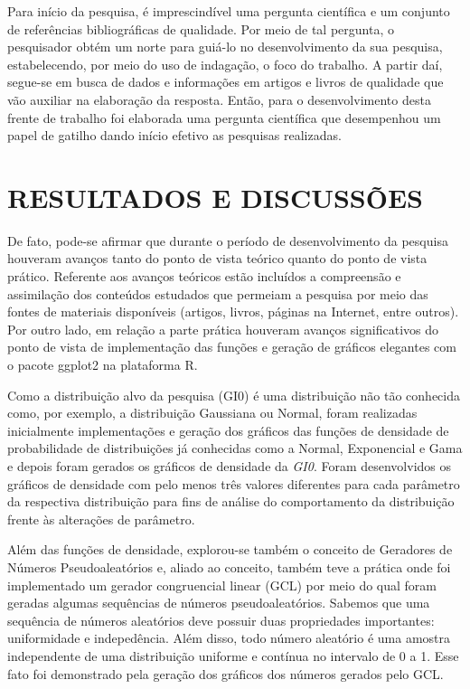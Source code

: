 \documentclass[12pt,letterpaper]{article}
\begin{document}
	Para início da pesquisa, é imprescindível uma pergunta científica e um conjunto de referências bibliográficas de qualidade. Por meio de tal pergunta, o pesquisador obtém um norte para guiá-lo no desenvolvimento da sua pesquisa, estabelecendo, por meio do uso de indagação, o foco do trabalho. A partir daí, segue-se em busca de dados e informações em artigos e livros de qualidade que vão auxiliar na elaboração da resposta. Então, para o desenvolvimento desta frente de trabalho foi elaborada uma pergunta científica que desempenhou um papel de gatilho dando início efetivo as pesquisas realizadas.



\newpage
\section*{\centering \textbf{RESULTADOS E DISCUSSÕES}} %

De fato, pode-se afirmar que durante o período de desenvolvimento da pesquisa houveram avanços tanto do ponto de vista teórico quanto do ponto de vista prático. Referente aos avanços teóricos estão incluídos a compreensão e assimilação dos conteúdos estudados que permeiam a pesquisa por meio das fontes de materiais disponíveis (artigos, livros, páginas na Internet, entre outros). Por outro lado, em relação a parte prática houveram avanços significativos do ponto de vista de implementação das funções e geração de gráficos elegantes com o pacote ggplot2 na plataforma R.

Como a distribuição alvo da pesquisa (GI0) é uma distribuição não tão conhecida como, por exemplo, a distribuição Gaussiana ou Normal, foram realizadas inicialmente implementações e geração dos gráficos das funções de densidade de probabilidade de distribuições já conhecidas como a Normal, Exponencial e Gama e depois foram gerados os gráficos de densidade da \textit{GI0}. Foram desenvolvidos os gráficos de densidade com pelo menos três valores diferentes para cada parâmetro da respectiva distribuição para fins de análise do comportamento da distribuição frente às alterações de parâmetro.

	Além das funções de densidade, explorou-se também o conceito de Geradores de Números Pseudoaleatórios e, aliado ao conceito, também teve a prática onde foi implementado um gerador congruencial linear (GCL) por meio do qual foram geradas algumas sequências de números pseudoaleatórios. Sabemos que uma sequência de números aleatórios deve possuir duas propriedades importantes: uniformidade e indepedência. Além disso, todo número aleatório é uma amostra independente de uma distribuição uniforme e contínua no intervalo de 0 a 1. Esse fato foi demonstrado pela geração dos gráficos dos números gerados pelo GCL.
    
\end{document}
